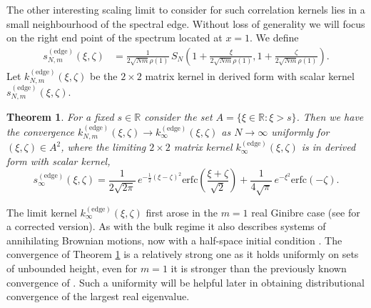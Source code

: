 \documentclass[11pt,reqno]{amsproc}
\newtheorem{theorem}{Theorem}
\numberwithin{equation}{section}
\numberwithin{theorem}{section}
\begin{document}
The other interesting scaling limit to consider for such correlation kernels lies in a small neighbourhood of the spectral edge. Without loss of generality we will focus on the right end point of the spectrum located at $x=1$. We define
\begin{align}
s^{(\mathrm{edge})}_{N,m}(\xi,\zeta) &= \frac{1}{2\sqrt{Nm}\rho(1)}\,S_{N}\left(1+\frac{\xi}{2\sqrt{Nm}\rho(1)},1+\frac{\zeta}{2\sqrt{Nm}\rho(1)}\right).
\end{align}
Let $k^{(\mathrm{edge})}_{N,m}(\xi,\zeta)$ be the $2 \times 2$ matrix kernel in derived form with scalar kernel $s_{N,m}^{(\mathrm{edge})}(\xi,\zeta)$.
\begin{theorem}
\label{th:edgeuniformityintro}
For a fixed $s \in \mathbb{R}$ consider the set $A = \{ \xi \in \mathbb{R} : \xi > s\}$. Then we have the convergence $k_{N,m}^{(\mathrm{edge})}(\xi,\zeta) \to k_{\infty}^{(\mathrm{edge})}(\xi,\zeta)$ as $N \to \infty$ uniformly for $(\xi,\zeta) \in A^{2}$, where the limiting $2 \times 2$ matrix kernel $k^{(\mathrm{edge})}_{\infty}(\xi,\zeta)$ is in derived form with scalar kernel,
\begin{equation}
s_{\infty}^{(\mathrm{edge})}(\xi,\zeta) = \frac{1}{2\sqrt{2\pi}}\,e^{-\frac{1}{2}(\xi-\zeta)^{2}}\mathrm{erfc}\left(\frac{\xi+\zeta}{\sqrt{2}}\right)+\frac{1}{4\sqrt{\pi}}\,e^{-\xi^{2}}\mathrm{erfc}(-\zeta).
\end{equation}
\end{theorem}
The limit kernel $k_{\infty}^{(\mathrm{edge})}(\xi,\zeta)$ first arose in the $m=1$ real Ginibre case \cite{BS09} (see \cite{BPSTZ16} for a corrected version). As with the bulk regime it also describes systems of annihilating Brownian motions, now with a half-space initial condition \cite{GPTZ18}. The convergence of Theorem \ref{th:edgeuniformityintro} is a relatively strong one as it holds uniformly on sets of unbounded height, even for $m=1$ it is stronger than the previously known convergence of \cite{BS09}. Such a uniformity will be helpful later in obtaining distributional convergence of the largest real eigenvalue. 
\end{document}

